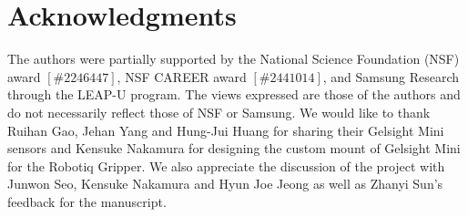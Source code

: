 \section{Acknowledgments}
The authors were partially supported by the National Science Foundation (NSF) award $[\#2246447]$, NSF CAREER award $[\#2441014]$, and Samsung Research through the LEAP-U program. The views expressed are those of the authors and do not necessarily reflect those of NSF or Samsung. We would like to thank Ruihan Gao, Jehan Yang and Hung-Jui Huang for sharing their Gelsight Mini sensors and Kensuke Nakamura for designing the custom mount of Gelsight Mini  for the Robotiq Gripper. We also appreciate the discussion of the project with Junwon Seo, Kensuke Nakamura and Hyun Joe Jeong as well as Zhanyi Sun's feedback for the manuscript. 
